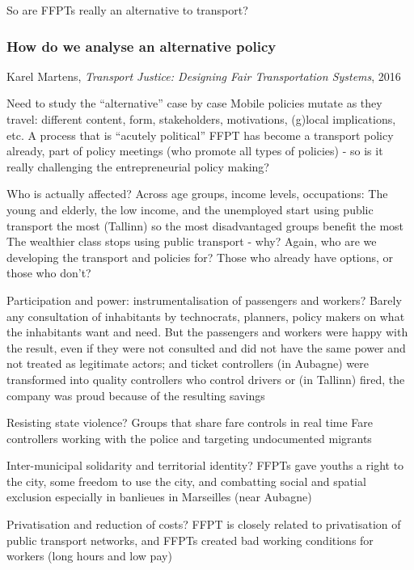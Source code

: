 \documentclass{article}
\begin{document}
So are FFPTs really an alternative to transport?

\subsubsection{How do we analyse an alternative policy}

Karel Martens, \textit{Transport Justice: Designing Fair Transportation Systems}, 2016

\begin{outline}
	\1 Need to study the ``alternative'' case by case
		\2 Mobile policies mutate as they travel: different content, form, stakeholders, motivations, (g)local implications, etc.
		\2 A process that is ``acutely political''
		\2 FFPT has become a transport policy already, part of policy meetings (who promote all types of policies) - so is it really challenging the entrepreneurial policy making?

	\1 Who is actually affected? Across age groups, income levels, occupations:
		\2 The young and elderly, the low income, and the unemployed start using public transport the most (Tallinn) so the most disadvantaged groups benefit the most
		\2 The wealthier class stops using public transport - why? Again, who are we developing the transport and policies for? Those who already have options, or those who don't?

	\1 Participation and power: instrumentalisation of passengers and workers? Barely any consultation of inhabitants by technocrats, planners, policy makers on what the inhabitants want and need. But the passengers and workers were happy with the result, even if they were not consulted and did not have the same power and not treated as legitimate actors; and ticket controllers (in Aubagne) were transformed into quality controllers who control drivers or (in Tallinn) fired, the company was proud because of the resulting savings

	\1 Resisting state violence? 
		\2 Groups that share fare controls in real time
		\2 Fare controllers working with the police and targeting undocumented migrants
		
	\1 Inter-municipal solidarity and territorial identity?
		\2 FFPTs gave youths a right to the city, some freedom to use the city, and combatting social and spatial exclusion especially in banlieues in Marseilles (near Aubagne)
	
	\1 Privatisation and reduction of costs?
		\2 FFPT is closely related to privatisation of public transport networks, and FFPTs created bad working conditions for workers (long hours and low pay)
\end{outline}
\end{document}
